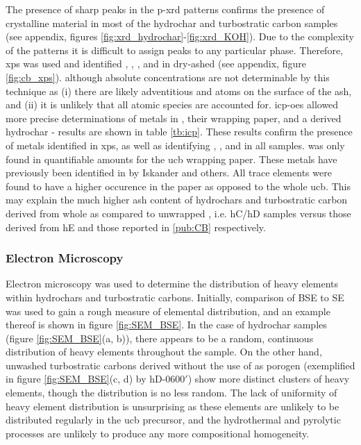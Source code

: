 The presence of sharp peaks in the \acrshort{p-xrd} patterns confirms the presence of crystalline material in most of the \gls{hydrochar} and \gls{turbostratic carbon} samples (see appendix, figures \ref{fig:xrd_hydrochar}-\ref{fig:xrd_KOH}). Due to the complexity of the patterns it is difficult to assign peaks to any particular phase. Therefore, \acrshort{xps} was used and identified , , , and  in dry-ashed  (see appendix, figure \ref{fig:cb_xps}). although absolute concentrations are not determinable by this technique as (i) there are likely adventitious  and  atoms on the surface of the ash, and (ii) it is unlikely that all atomic species are accounted for. \acrshort{icp-oes} allowed more precise determinations of metals in , their wrapping paper, and a derived \gls{hydrochar} - results are shown in table \ref{tb:icp}. These results confirm the presence of metals identified in \acrshort{xps}, as well as identifying , , and  in all samples.  was only found in quantifiable amounts for the \acrshort{ucb} wrapping paper. These metals have previously been identified in  by Iskander and others.\citep{chevalier2018nano, cardoso2018exposure, iskander1992multielement, jenkins1985neutron} All trace elements were found to have a higher occurence in the paper as opposed to the whole \acrshort{ucb}. This may explain the much higher \gls{ash content} of \glspl{hydrochar} and \gls{turbostratic carbon} derived from whole  as compared to unwrapped , i.e. hC/hD  samples versus those derived from hE and those reported in \ref{pub:CB} respectively. 

\subsubsection{Electron Microscopy}

Electron microscopy was used to determine the distribution of heavy elements within \glspl{hydrochar} and \glspl{turbostratic carbon}. Initially, comparison of BSE to SE was used to gain a rough measure of elemental distribution, and an example thereof is shown in figure \ref{fig:SEM_BSE}. In the case of \gls{hydrochar} samples (figure \ref{fig:SEM_BSE}(a, b)), there appears to be a random, continuous distribution of heavy elements throughout the sample. On the other hand, unwashed \glspl{turbostratic carbon} derived without the use of  as \gls{porogen} (exemplified in figure \ref{fig:SEM_BSE}(c, d) by hD-0600$'$) show more distinct clusters of heavy elements, though the distribution is no less random. The lack of uniformity of heavy element distribution is unsurprising as these elements are unlikely to be distributed regularly in the \acrshort{ucb} precursor, and the hydrothermal and pyrolytic processes are unlikely to produce any more compositional homogeneity. 

